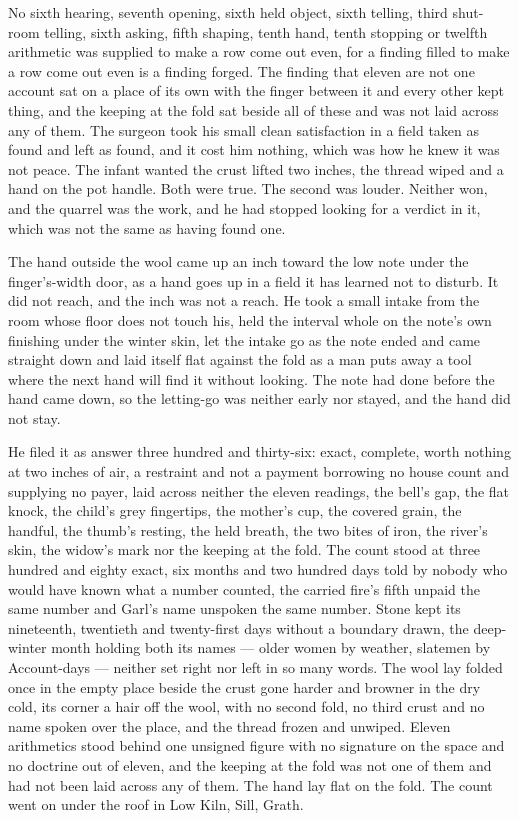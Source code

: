 No sixth hearing, seventh opening, sixth held object, sixth telling, third shut-room telling, sixth asking, fifth shaping, tenth hand, tenth stopping or twelfth arithmetic was supplied to make a row come out even, for a finding filled to make a row come out even is a finding forged. The finding that eleven are not one account sat on a place of its own with the finger between it and every other kept thing, and the keeping at the fold sat beside all of these and was not laid across any of them. The surgeon took his small clean satisfaction in a field taken as found and left as found, and it cost him nothing, which was how he knew it was not peace. The infant wanted the crust lifted two inches, the thread wiped and a hand on the pot handle. Both were true. The second was louder. Neither won, and the quarrel was the work, and he had stopped looking for a verdict in it, which was not the same as having found one.

\scenebreak

The hand outside the wool came up an inch toward the low note under the finger's-width door, as a hand goes up in a field it has learned not to disturb. It did not reach, and the inch was not a reach. He took a small intake from the room whose floor does not touch his, held the interval whole on the note's own finishing under the winter skin, let the intake go as the note ended and came straight down and laid itself flat against the fold as a man puts away a tool where the next hand will find it without looking. The note had done before the hand came down, so the letting-go was neither early nor stayed, and the hand did not stay.

He filed it as answer three hundred and thirty-six: exact, complete, worth nothing at two inches of air, a restraint and not a payment borrowing no house count and supplying no payer, laid across neither the eleven readings, the bell's gap, the flat knock, the child's grey fingertips, the mother's cup, the covered grain, the handful, the thumb's resting, the held breath, the two bites of iron, the river's skin, the widow's mark nor the keeping at the fold. The count stood at three hundred and eighty exact, six months and two hundred days told by nobody who would have known what a number counted, the carried fire's fifth unpaid the same number and Garl's name unspoken the same number. Stone kept its nineteenth, twentieth and twenty-first days without a boundary drawn, the deep-winter month holding both its names — older women by weather, slatemen by Account-days — neither set right nor left in so many words. The wool lay folded once in the empty place beside the crust gone harder and browner in the dry cold, its corner a hair off the wool, with no second fold, no third crust and no name spoken over the place, and the thread frozen and unwiped. Eleven arithmetics stood behind one unsigned figure with no signature on the space and no doctrine out of eleven, and the keeping at the fold was not one of them and had not been laid across any of them. The hand lay flat on the fold. The count went on under the roof in Low Kiln, Sill, Grath.
